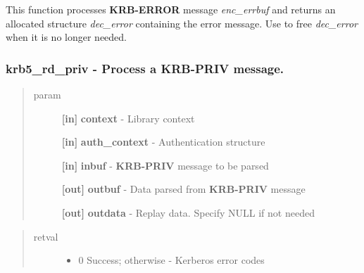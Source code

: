 \documentclass[letterpaper,10pt,english]{sphinxmanual}
\begin{document}
This function processes \textbf{KRB-ERROR} message \emph{enc\_errbuf} and returns an allocated structure \emph{dec\_error} containing the error message. Use {\hyperref[appdev/refs/api/krb5_free_error:krb5_free_error]{}} to free \emph{dec\_error} when it is no longer needed.


\subsubsection{krb5\_rd\_priv -  Process a KRB-PRIV message.}
\label{appdev/refs/api/krb5_rd_priv:krb5-rd-priv-process-a-krb-priv-message}\label{appdev/refs/api/krb5_rd_priv::doc}

\begin{fulllineitems}
\label{appdev/refs/api/krb5_rd_priv:krb5_rd_priv}
\end{fulllineitems}

\begin{quote}\begin{description}
\item[{param}] \leavevmode
\textbf{{[}in{]}} \textbf{context} - Library context

\textbf{{[}in{]}} \textbf{auth\_context} - Authentication structure

\textbf{{[}in{]}} \textbf{inbuf} - \textbf{KRB-PRIV} message to be parsed

\textbf{{[}out{]}} \textbf{outbuf} - Data parsed from \textbf{KRB-PRIV} message

\textbf{{[}out{]}} \textbf{outdata} - Replay data. Specify NULL if not needed

\end{description}\end{quote}
\begin{quote}\begin{description}
\item[{retval}] \leavevmode\begin{itemize}
\item {} 
0   Success; otherwise - Kerberos error codes

\end{itemize}

\end{description}\end{quote}
\end{document}
